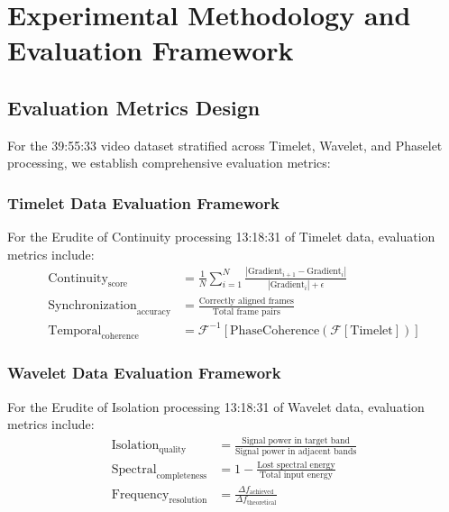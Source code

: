 \section{Experimental Methodology and Evaluation Framework}

\subsection{Evaluation Metrics Design}

For the 39:55:33 video dataset stratified across Timelet, Wavelet, and Phaselet processing, we establish comprehensive evaluation metrics:

\subsubsection{Timelet Data Evaluation Framework}

\begin{definition}
For the Erudite of Continuity processing 13:18:31 of Timelet data, evaluation metrics include:
\begin{align}
\text{Continuity}_{\text{score}} &= \frac{1}{N} \sum_{i=1}^{N} \frac{|\text{Gradient}_{i+1} - \text{Gradient}_i|}{|\text{Gradient}_i| + \epsilon} \\
\text{Synchronization}_{\text{accuracy}} &= \frac{\text{Correctly aligned frames}}{\text{Total frame pairs}} \\
\text{Temporal}_{\text{coherence}} &= \mathcal{F}^{-1}[\text{PhaseCoherence}(\mathcal{F}[\text{Timelet}])]
\end{align}
\end{definition}

\subsubsection{Wavelet Data Evaluation Framework}

\begin{definition}
For the Erudite of Isolation processing 13:18:31 of Wavelet data, evaluation metrics include:
\begin{align}
\text{Isolation}_{\text{quality}} &= \frac{\text{Signal power in target band}}{\text{Signal power in adjacent bands}} \\
\text{Spectral}_{\text{completeness}} &= 1 - \frac{\text{Lost spectral energy}}{\text{Total input energy}} \\
\text{Frequency}_{\text{resolution}} &= \frac{\Delta f_{\text{achieved}}}{\Delta f_{\text{theoretical}}}
\end{align}
\end{definition}

